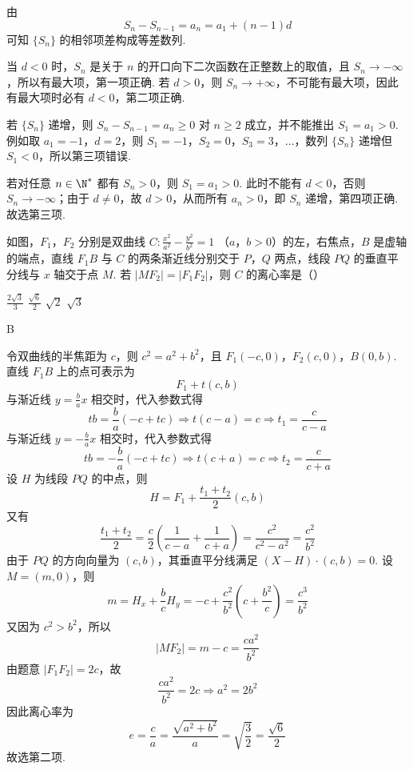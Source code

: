 \begin{solution}
由
\[
S_n-S_{n-1}=a_n=a_1+(n-1)d
\]
可知 \(\{S_n\}\) 的相邻项差构成等差数列.

当 \(d<0\) 时，\(S_n\) 是关于 \(n\) 的开口向下二次函数在正整数上的取值，且 \(S_n\to-\infty\)，所以有最大项，第一项正确. 若 \(d>0\)，则 \(S_n\to+\infty\)，不可能有最大项，因此有最大项时必有 \(d<0\)，第二项正确.

若 \(\{S_n\}\) 递增，则 \(S_n-S_{n-1}=a_n\geqslant0\) 对 \(n\geqslant2\) 成立，并不能推出 \(S_1=a_1>0\). 例如取 \(a_1=-1\)，\(d=2\)，则 \(S_1=-1\)，\(S_2=0\)，\(S_3=3\)，\(\ldots\)，数列 \(\{S_n\}\) 递增但 \(S_1<0\)，所以第三项错误.

若对任意 \(n\in\N^{*}\) 都有 \(S_n>0\)，则 \(S_1=a_1>0\). 此时不能有 \(d<0\)，否则 \(S_n\to-\infty\)；由于 \(d\ne0\)，故 \(d>0\)，从而所有 \(a_n>0\)，即 \(S_n\) 递增，第四项正确. 故选第三项.
\end{solution}

\begin{problem}
如图，\(F_{1}\)，\(F_{2}\) 分别是双曲线 \(C: \frac{x^{2}}{a^{2}} - \frac{y^{2}}{b^{2}} = 1 \) （\(a\)，\(b > 0\)）的左，右焦点，\(B\) 是虚轴的端点，直线 \(F_{1}B\) 与 \(C\) 的两条渐近线分别交于 \(P\)，\(Q\) 两点，线段 \(PQ\) 的垂直平分线与 \(x\) 轴交于点 \(M\). 若 \(|MF_{2}| = |F_{1}F_{2}|\)，则 \(C\) 的离心率是（\quad）

\choices
    {\(\frac{2\sqrt{3}}{3}\)}
    {\(\frac{\sqrt{6}}{2}\)}
    {\(\sqrt{2}\)}
    {\(\sqrt{3}\)}
\end{problem}

\begin{answer}
B
\end{answer}

\begin{solution}
令双曲线的半焦距为 \(c\)，则 \(c^2=a^2+b^2\)，且 \(F_1(-c,0)\)，\(F_2(c,0)\)，\(B(0,b)\). 直线 \(F_1B\) 上的点可表示为
\[
F_1+t(c,b)
\]
与渐近线 \(y=\frac ba x\) 相交时，代入参数式得
\[
tb=\frac ba(-c+tc)\Longrightarrow t(c-a)=c\Longrightarrow t_1=\frac{c}{c-a}
\]
与渐近线 \(y=-\frac ba x\) 相交时，代入参数式得
\[
tb=-\frac ba(-c+tc)\Longrightarrow t(c+a)=c\Longrightarrow t_2=\frac{c}{c+a}
\]
设 \(H\) 为线段 \(PQ\) 的中点，则
\[
H=F_1+\frac{t_1+t_2}{2}(c,b)
\]
又有
\[
\frac{t_1+t_2}{2}
=\frac c2\left(\frac1{c-a}+\frac1{c+a}\right)
=\frac{c^2}{c^2-a^2}
=\frac{c^2}{b^2}
\]
由于 \(PQ\) 的方向向量为 \((c,b)\)，其垂直平分线满足 \((X-H)\cdot(c,b)=0\). 设 \(M=(m,0)\)，则
\[
m=H_x+\frac bcH_y
=-c+\frac{c^2}{b^2}\left(c+\frac{b^2}{c}\right)
=\frac{c^3}{b^2}
\]
又因为 \(c^2>b^2\)，所以
\[
|MF_2|=m-c=\frac{ca^2}{b^2}
\]
由题意 \(|F_1F_2|=2c\)，故
\[
\frac{ca^2}{b^2}=2c\Longrightarrow a^2=2b^2
\]
因此离心率为
\[
e=\frac ca=\frac{\sqrt{a^2+b^2}}a=\sqrt{\frac32}=\frac{\sqrt6}{2}
\]
故选第二项.
\end{solution}

